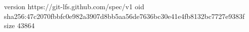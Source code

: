 version https://git-lfs.github.com/spec/v1
oid sha256:47c2070fbbfc0e982a3907d8bb5aa56de7636bc30e41e4fb8132bc7727e9383f
size 43864
